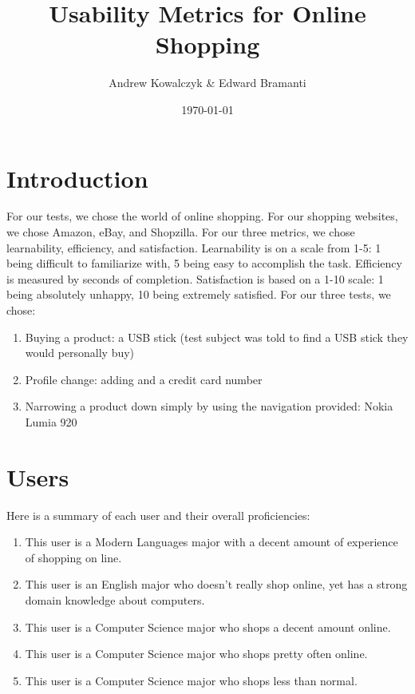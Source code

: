 \documentclass[11pt, oneside]{article}   	%
\title{Usability Metrics for Online Shopping}
\author{Andrew Kowalczyk \& Edward Bramanti}
\date{\today}							%
\begin{document}
\maketitle

\section{Introduction}
For our tests, we chose the world of online shopping. For our shopping websites, we chose Amazon, eBay, and Shopzilla.
For our three metrics, we chose learnability, efficiency, and satisfaction. Learnability is on a scale from 1-5: 1 being difficult to familiarize with, 5 being easy to accomplish the task. Efficiency is measured by seconds of completion. Satisfaction is based on a 1-10 scale: 1 being absolutely unhappy, 10 being extremely satisfied.  For our three tests, we chose:

\begin{enumerate}
    \item Buying a product: a USB stick (test subject was told to find a USB stick they would personally buy)
    \item Profile change: adding and a credit card number %
    \item Narrowing a product down simply by using the navigation provided: Nokia Lumia 920
\end{enumerate}

\section{Users}

Here is a summary of each user and their overall proficiencies:

\begin{enumerate}
    \item This user is a Modern Languages major with a decent amount of experience of shopping on line.
    \item This user is an English major who doesn't really shop online, yet has a strong domain knowledge about computers.
    \item This user is a Computer Science major who shops a decent amount online.
    \item This user is a Computer Science major who shops pretty often online.
    \item This user is a Computer Science major who shops less than normal. %
\end{enumerate}
\end{document}
